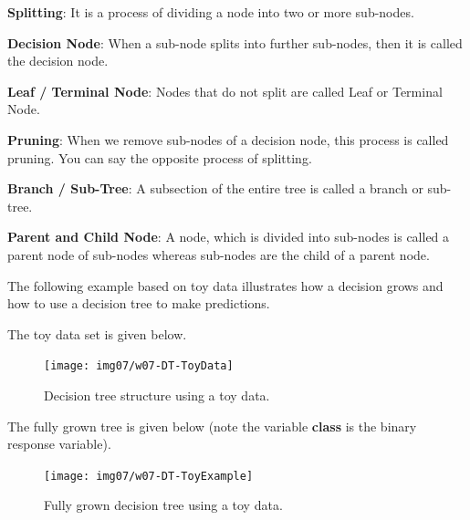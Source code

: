 \documentclass[
]{book}
\begin{document}
\textbf{Splitting}: It is a process of dividing a node into two or more sub-nodes.

\textbf{Decision Node}: When a sub-node splits into further sub-nodes, then it is called the decision node.

\textbf{Leaf / Terminal Node}: Nodes that do not split are called Leaf or Terminal Node.

\textbf{Pruning}: When we remove sub-nodes of a decision node, this process is called pruning. You can say the opposite process of splitting.

\textbf{Branch / Sub-Tree}: A subsection of the entire tree is called a branch or sub-tree.

\textbf{Parent and Child Node}: A node, which is divided into sub-nodes is called a parent node of sub-nodes whereas sub-nodes are the child of a parent node.

\hfill\break

The following example based on toy data illustrates how a decision grows and how to use a decision tree to make predictions.

The toy data set is given below.

\begin{figure}

{\centering \texttt{[image: img07/w07-DT-ToyData]} 

}

\caption{Decision tree structure using a toy data.}\label{fig:unnamed-chunk-170}
\end{figure}

The fully grown tree is given below (note the variable \textbf{class} is the binary response variable).

\begin{figure}

{\centering \texttt{[image: img07/w07-DT-ToyExample]} 

}

\caption{Fully grown decision tree using a toy data.}\label{fig:unnamed-chunk-171}
\end{figure}
\end{document}
